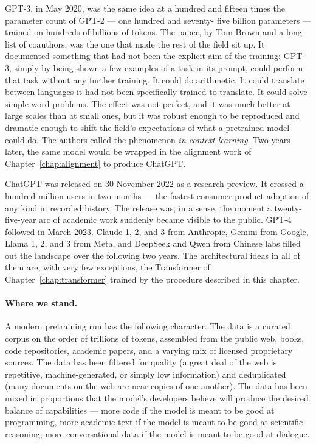GPT-3, in May 2020, was the same idea at a hundred and fifteen
times the parameter count of GPT-2 --- one hundred and seventy-
five billion parameters --- trained on hundreds of billions of
tokens. The paper, by Tom Brown and a long list of coauthors,
was the one that made the rest of the field sit up. It
documented something that had not been the explicit aim of the
training: GPT-3, simply by being shown a few examples of a task
in its prompt, could perform that task without any further
training. It could do arithmetic. It could translate between
languages it had not been specifically trained to translate. It
could solve simple word problems. The effect was not perfect,
and it was much better at large scales than at small ones, but
it was robust enough to be reproduced and dramatic enough to
shift the field's expectations of what a pretrained model
could do. The authors called the phenomenon \emph{in-context
learning}. Two years later, the same model would be wrapped in
the alignment work of Chapter~\ref{chap:alignment} to produce ChatGPT.

ChatGPT was released on 30 November 2022 as a research
preview. It crossed a hundred million users in two months ---
the fastest consumer product adoption of any kind in recorded
history. The release was, in a sense, the moment a
twenty-five-year arc of academic work suddenly became visible
to the public. GPT-4 followed in March 2023. Claude 1, 2, and
3 from Anthropic, Gemini from Google, Llama 1, 2, and 3 from
Meta, and DeepSeek and Qwen from Chinese labs filled out the
landscape over the following two years. The architectural
ideas in all of them are, with very few exceptions, the
Transformer of Chapter~\ref{chap:transformer} trained by the procedure described in
this chapter.

\paragraph{Where we stand.} A modern pretraining run has the following character. The data
is a curated corpus on the order of trillions of tokens,
assembled from the public web, books, code repositories,
academic papers, and a varying mix of licensed proprietary
sources. The data has been filtered for quality (a great deal
of the web is repetitive, machine-generated, or simply low
information) and deduplicated (many documents on the web are
near-copies of one another). The data has been mixed in
proportions that the model's developers believe will produce
the desired balance of capabilities --- more code if the model
is meant to be good at programming, more academic text if the
model is meant to be good at scientific reasoning, more
conversational data if the model is meant to be good at
dialogue.

